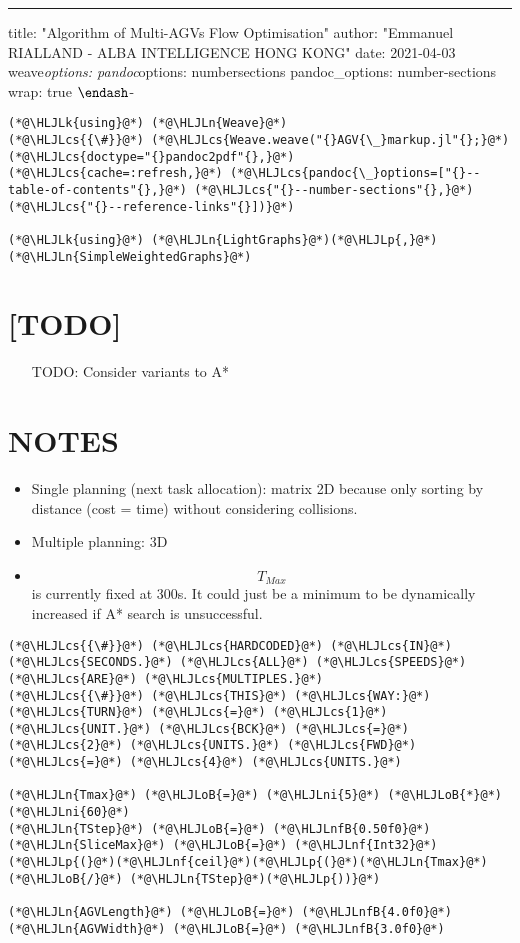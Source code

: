 \documentclass[12pt,a4paper]{article}
\newcommand{\HLJLk}[1]{\textcolor[RGB]{148,91,176}{\textbf{#1}}}
\newcommand{\HLJLn}[1]{#1}
\newcommand{\HLJLnf}[1]{\textcolor[RGB]{66,102,213}{#1}}
\newcommand{\HLJLnfB}[1]{\textcolor[RGB]{59,151,46}{#1}}
\newcommand{\HLJLni}[1]{\textcolor[RGB]{59,151,46}{#1}}
\newcommand{\HLJLoB}[1]{\textcolor[RGB]{102,102,102}{\textbf{#1}}}
\newcommand{\HLJLp}[1]{#1}
\newcommand{\HLJLcs}[1]{\textcolor[RGB]{153,153,119}{\textit{#1}}}
\begin{document}
\rule{\textwidth}{1pt}
title: "Algorithm of Multi-AGVs Flow Optimisation" author: "Emmanuel RIALLAND - ALBA INTELLIGENCE HONG KONG" date: 2021-04-03 weave\emph{options:     pandoc}options: numbersections     pandoc\_options: number-sections     wrap: true \ensuremath{\endash}-


\begin{lstlisting}
(*@\HLJLk{using}@*) (*@\HLJLn{Weave}@*)
(*@\HLJLcs{{\#}}@*) (*@\HLJLcs{Weave.weave("{}AGV{\_}markup.jl"{};}@*) (*@\HLJLcs{doctype="{}pandoc2pdf"{},}@*) (*@\HLJLcs{cache=:refresh,}@*) (*@\HLJLcs{pandoc{\_}options=["{}--table-of-contents"{},}@*) (*@\HLJLcs{"{}--number-sections"{},}@*) (*@\HLJLcs{"{}--reference-links"{}])}@*)

(*@\HLJLk{using}@*) (*@\HLJLn{LightGraphs}@*)(*@\HLJLp{,}@*) (*@\HLJLn{SimpleWeightedGraphs}@*)
\end{lstlisting}


\section{[TODO]}
\begin{itemize}
\item [TODO: Consider variants to A*]

\end{itemize}
\section{NOTES}
\begin{itemize}
\item Single planning (next task allocation): matrix 2D because only sorting by distance (cost = time) without considering collisions.


\item Multiple planning: 3D


\item \[
T_{Max}
\]
is currently fixed at 300s. It could just be a minimum to be dynamically increased if A* search is unsuccessful.

\end{itemize}

\begin{lstlisting}
(*@\HLJLcs{{\#}}@*) (*@\HLJLcs{HARDCODED}@*) (*@\HLJLcs{IN}@*) (*@\HLJLcs{SECONDS.}@*) (*@\HLJLcs{ALL}@*) (*@\HLJLcs{SPEEDS}@*) (*@\HLJLcs{ARE}@*) (*@\HLJLcs{MULTIPLES.}@*)
(*@\HLJLcs{{\#}}@*) (*@\HLJLcs{THIS}@*) (*@\HLJLcs{WAY:}@*) (*@\HLJLcs{TURN}@*) (*@\HLJLcs{=}@*) (*@\HLJLcs{1}@*) (*@\HLJLcs{UNIT.}@*) (*@\HLJLcs{BCK}@*) (*@\HLJLcs{=}@*) (*@\HLJLcs{2}@*) (*@\HLJLcs{UNITS.}@*) (*@\HLJLcs{FWD}@*) (*@\HLJLcs{=}@*) (*@\HLJLcs{4}@*) (*@\HLJLcs{UNITS.}@*)

(*@\HLJLn{Tmax}@*) (*@\HLJLoB{=}@*) (*@\HLJLni{5}@*) (*@\HLJLoB{*}@*) (*@\HLJLni{60}@*)
(*@\HLJLn{TStep}@*) (*@\HLJLoB{=}@*) (*@\HLJLnfB{0.50f0}@*)
(*@\HLJLn{SliceMax}@*) (*@\HLJLoB{=}@*) (*@\HLJLnf{Int32}@*)(*@\HLJLp{(}@*)(*@\HLJLnf{ceil}@*)(*@\HLJLp{(}@*)(*@\HLJLn{Tmax}@*) (*@\HLJLoB{/}@*) (*@\HLJLn{TStep}@*)(*@\HLJLp{))}@*)

(*@\HLJLn{AGVLength}@*) (*@\HLJLoB{=}@*) (*@\HLJLnfB{4.0f0}@*)
(*@\HLJLn{AGVWidth}@*) (*@\HLJLoB{=}@*) (*@\HLJLnfB{3.0f0}@*)
\end{lstlisting}
\end{document}
